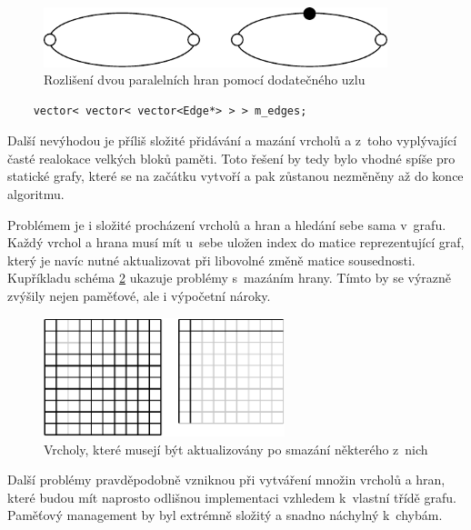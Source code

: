 \documentclass[11pt,twoside,a4paper]{book}
\begin{document}
\begin{figure}[ht]
\begin{center}
\includegraphics[width=10cm]{img/parallel_edges.pdf}
\caption{Rozlišení dvou paralelních hran pomocí dodatečného uzlu}
\label{fig:parallel_edges}
\end{center}
\end{figure}

\begin{verbatim}
    vector< vector< vector<Edge*> > > m_edges;
\end{verbatim}

Další nevýhodou je příliš složité přidávání a mazání vrcholů a z~toho vyplývající časté realokace velkých bloků paměti. Toto řešení by tedy bylo vhodné spíše pro statické grafy, které se na začátku vytvoří a pak zůstanou nezměněny až do konce algoritmu.

Problémem je i složité procházení vrcholů a hran a hledání sebe sama v~grafu. Každý vrchol a hrana musí mít u~sebe uložen index do matice reprezentující graf, který je navíc nutné aktualizovat při libovolné změně matice sousednosti. Kupříkladu schéma \ref{fig:update_indices} ukazuje problémy s~mazáním hrany. Tímto by se výrazně zvýšily nejen paměťové, ale i výpočetní nároky.

\begin{figure}[ht]
\begin{center}
\includegraphics[width=7cm]{img/update_indices.pdf}
\caption{Vrcholy, které musejí být aktualizovány po smazání některého z~nich}
\label{fig:update_indices}
\end{center}
\end{figure}

Další problémy pravděpodobně vzniknou při vytváření množin vrcholů a hran, které budou mít naprosto odlišnou implementaci vzhledem k~vlastní třídě grafu. Paměťový management by byl extrémně složitý a snadno náchylný k~chybám.
\end{document}
